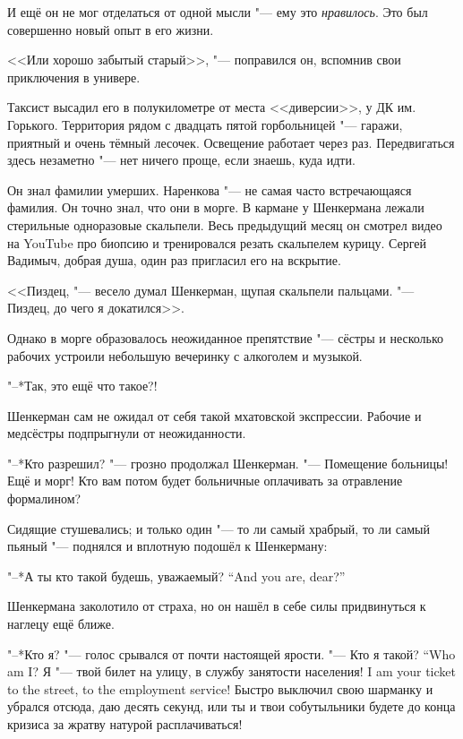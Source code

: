 И ещё он не мог отделаться от одной мысли "--- ему это \emph{нравилось}.
Это был совершенно новый опыт в его жизни.

<<Или хорошо забытый старый>>, "--- поправился он, вспомнив свои приключения в универе.

Таксист высадил его в полукилометре от места <<диверсии>>, у ДК им. Горького.
Территория рядом с двадцать пятой горбольницей "--- гаражи, приятный и очень тёмный лесочек.
Освещение работает через раз.
Передвигаться здесь незаметно "--- нет ничего проще, если знаешь, куда идти.

Он знал фамилии умерших.
Наренкова "--- не самая часто встречающаяся фамилия.
Он точно знал, что они в морге.
В кармане у Шенкермана лежали стерильные одноразовые скальпели.
Весь предыдущий месяц он смотрел видео на YouTube про биопсию и тренировался резать скальпелем курицу.
Сергей Вадимыч, добрая душа, один раз пригласил его на вскрытие.

<<Пиздец, "--- весело думал Шенкерман, щупая скальпели пальцами.
"--- Пиздец, до чего я докатился>>.

\textspace

Однако в морге образовалось неожиданное препятствие "--- сёстры и несколько рабочих устроили небольшую вечеринку с алкоголем и музыкой.

"--*Так, это ещё что такое?!

Шенкерман сам не ожидал от себя такой мхатовской экспрессии.
Рабочие и медсёстры подпрыгнули от неожиданности.

"--*Кто разрешил? "--- грозно продолжал Шенкерман.
"--- Помещение больницы!
Ещё и морг!
Кто вам потом будет больничные оплачивать за отравление формалином?

Сидящие стушевались;
и только один "--- то ли самый храбрый, то ли самый пьяный "--- поднялся и вплотную подошёл к Шенкерману:

{"--*А ты кто такой будешь, уважаемый?}
{``And you are, dear?''}

Шенкермана заколотило от страха, но он нашёл в себе силы придвинуться к наглецу ещё ближе.

"--*Кто я? "--- голос срывался от почти настоящей ярости.
{"--- Кто я такой?}
{``Who am I?}
{Я "--- твой билет на улицу, в службу занятости населения!}
{I am your ticket to the street, to the employment service!}
Быстро выключил свою шарманку и убрался отсюда, даю десять секунд, или ты и твои собутыльники будете до конца кризиса за жратву натурой расплачиваться!

